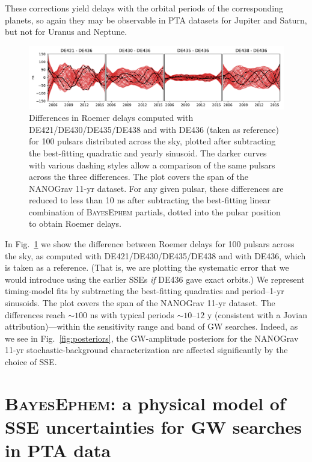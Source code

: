 \documentclass[reprint,
 amsmath,amssymb,
 aps,prd,floatfix,
]{revtex4-1}
\begin{document}
These corrections yield delays with the orbital periods of the corresponding planets, so again they may be observable in PTA datasets for Jupiter and Saturn, but not for Uranus and Neptune.
%
\begin{figure}[t]
    \centering
    \includegraphics[width=2\columnwidth]{figures/roemerdiff.pdf}
    \caption{Differences in Roemer delays computed with DE421/DE430/DE435/DE438 and with DE436 (taken as reference) for 100 pulsars distributed across the sky, plotted after subtracting the best-fitting quadratic and yearly sinusoid. The darker curves with various dashing styles allow a comparison of the same pulsars across the three differences. The plot covers the span of the NANOGrav 11-yr dataset.
    For any given pulsar, these differences are reduced to less than 10 ns after subtracting the best-fitting linear combination of \textsc{BayesEphem} partials, dotted into the pulsar position to obtain Roemer delays.
    }
    \label{fig:roemer}
\end{figure}

In Fig.\ \ref{fig:roemer} we show the difference between Roemer delays for 100 pulsars across the sky, as computed with DE421/DE430/DE435/DE438 and with DE436, which is taken as a reference. (That is, we are plotting the systematic error that we would introduce using the earlier SSEs \emph{if} DE436 gave exact orbits.) We represent timing-model fits by subtracting the best-fitting quadratics and period--1-yr sinusoids. The plot covers the span of the NANOGrav 11-yr dataset.
The differences reach $\sim 100$ ns with typical periods $\sim 10$--$12$ y (consistent with a Jovian attribution)---within the sensitivity range and band of GW searches. Indeed, as we see in Fig.\ \ref{fig:posteriors}, the GW-amplitude posteriors for the NANOGrav 11-yr stochastic-background characterization are affected significantly by the choice of SSE.

\section{\textsc{BayesEphem}: a physical model of SSE uncertainties for GW searches in PTA data}
\label{sec:physical}
\end{document}
